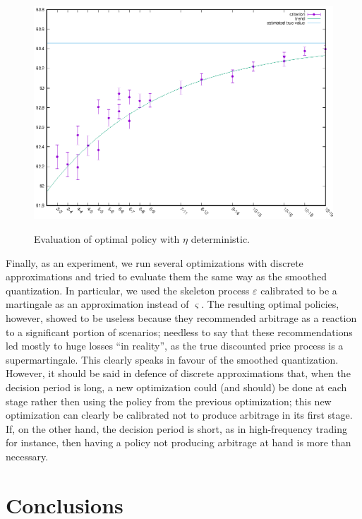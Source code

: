 \documentclass{article}              %
\begin{document}
\begin{figure}
\begin{center}
\includegraphics{mcvs0}
\label{fig:mcvs0}\caption{Evaluation of optimal policy with $\eta$ deterministic.}
\end{center}
\end{figure}


Finally, as an experiment, we run several optimizations with discrete
approximations and tried to evaluate them the same way as the smoothed
quantization. In particular, we used the skeleton process $\varepsilon$
calibrated to be a martingale as an approximation instead of $\varsigma$.
The resulting optimal policies, however, showed to be useless because they recommended
arbitrage as a reaction to a significant portion of scenarios; needless
to say that these recommendations led mostly to huge losses ``in reality'', as the true
discounted price process is a supermartingale. This clearly speaks
in favour of the smoothed quantization. However, it should be said in
defence of discrete approximations that, when the decision period
is long, a new optimization could (and should) be done at each stage
rather then using the policy from the previous optimization; this
new optimization can clearly be calibrated not to produce arbitrage in its first stage. If, on the other hand, the decision period is
short, as in high-frequency trading for instance, then
having a policy not producing arbitrage at hand is more than necessary.

\section{Conclusions} 
\label{sec:conc}
\end{document}
